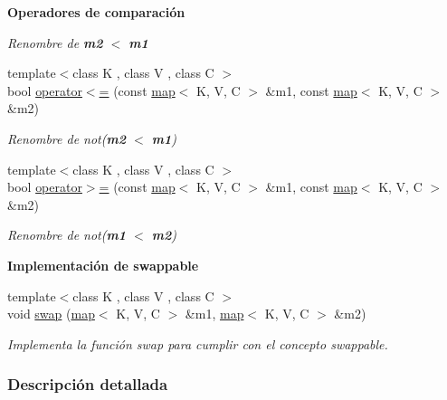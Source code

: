 \begin{Indent}{\bf Operadores de comparación}
\begin{DoxyCompactItemize}
\begin{DoxyCompactList}\small\item\em Renombre de {\bfseries m2} $<$ {\bfseries m1} \end{DoxyCompactList}\item 
{\footnotesize template$<$class K , class V , class C $>$ }\\bool \hyperlink{classaed2_1_1map_afe374b37f17263d0cad3ee19a590d208_afe374b37f17263d0cad3ee19a590d208}{operator$<$=} (const \hyperlink{classaed2_1_1map}{map}$<$ K, V, C $>$ \&m1, const \hyperlink{classaed2_1_1map}{map}$<$ K, V, C $>$ \&m2)
\begin{DoxyCompactList}\small\item\em Renombre de not({\bfseries m2} $<$ {\bfseries m1}) \end{DoxyCompactList}\item 
{\footnotesize template$<$class K , class V , class C $>$ }\\bool \hyperlink{classaed2_1_1map_a093a6d1a055339c5fc6297a1d47a9159_a093a6d1a055339c5fc6297a1d47a9159}{operator$>$=} (const \hyperlink{classaed2_1_1map}{map}$<$ K, V, C $>$ \&m1, const \hyperlink{classaed2_1_1map}{map}$<$ K, V, C $>$ \&m2)
\begin{DoxyCompactList}\small\item\em Renombre de not({\bfseries m1} $<$ {\bfseries m2}) \end{DoxyCompactList}\end{DoxyCompactItemize}
\end{Indent}
\begin{Indent}{\bf Implementación de swappable}\par
\begin{DoxyCompactItemize}
\item 
{\footnotesize template$<$class K , class V , class C $>$ }\\void \hyperlink{classaed2_1_1map_a119cb2938bbc11c25ebd4fb824782a72_a119cb2938bbc11c25ebd4fb824782a72}{swap} (\hyperlink{classaed2_1_1map}{map}$<$ K, V, C $>$ \&m1, \hyperlink{classaed2_1_1map}{map}$<$ K, V, C $>$ \&m2)
\begin{DoxyCompactList}\small\item\em Implementa la función swap para cumplir con el concepto swappable. \end{DoxyCompactList}\end{DoxyCompactItemize}
\end{Indent}


\subsubsection{Descripción detallada}
